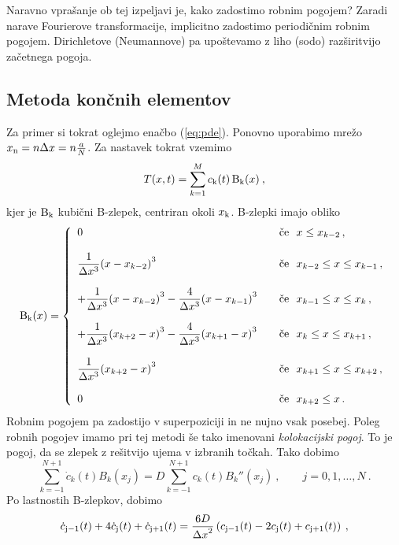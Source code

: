 \documentclass{porocilo}
\begin{document}
\newpage
Naravno vprašanje ob tej izpeljavi je, kako zadostimo robnim pogojem? Zaradi narave Fourierove transformacije, implicitno zadostimo periodičnim robnim pogojem. Dirichletove (Neumannove) pa upoštevamo z liho (sodo) razširitvijo začetnega pogoja.

\subsection{Metoda končnih elementov}
Za primer si tokrat oglejmo enačbo (\ref{eq:pde}). Ponovno uporabimo mrežo $x_{\rm n} = n \Delta x = n \tfrac{a}{N}$. Za nastavek tokrat vzemimo
\begin{equation*}
    T(x, t) = \sum_{k=1}^{M} c_{\rm k}(t) \, \mathrm{B}_{\rm k}(x) \>,
\end{equation*}
kjer je $\mathrm{B}_{\rm k}$ kubični B-zlepek, centriran okoli $x_{\rm k}$. B-zlepki imajo obliko
\begin{equation*}
    \mathrm{B}_{\rm k}(x) = \left\{
    \begin{array}{ll}
        0
         & \quad\text{če~~} x \le x_{k-2} \, , \cr
         & \cr
        \displaystyle\frac{1}{\Delta x^3} {(x - x_{k-2})}^3
         & \quad\text{če~~} x_{k-2} \le x \le x_{k-1} \, , \cr
         & \cr
        +\displaystyle\frac{1}{\Delta x^3} {(x - x_{k-2})}^3
        -\displaystyle\frac{4}{\Delta x^3} {(x - x_{k-1})}^3
         & \quad\text{če~~} x_{k-1} \le x \le x_{k} \, , \cr
         & \cr
        +\displaystyle\frac{1}{\Delta x^3} {(x_{k+2} - x)}^3
        -\displaystyle\frac{4}{\Delta x^3} {(x_{k+1} - x)}^3
         & \quad\text{če~~} x_{k} \le x \le x_{k+1} \, , \cr
         & \cr
        \displaystyle\frac{1}{\Delta x^3} {(x_{k+2} - x)}^3
         & \quad\text{če~~} x_{k+1} \le x \le x_{k+2} \, , \cr
         & \cr
        0
         & \quad\text{če~~} x_{k+2} \le x \, .
    \end{array}\right.
\end{equation*}
Robnim pogojem pa zadostijo v superpoziciji in ne nujno vsak posebej. Poleg robnih pogojev imamo pri tej metodi še tako imenovani \textit{kolokacijski pogoj}. To je pogoj, da se zlepek z rešitvijo ujema v izbranih točkah. Tako dobimo
\begin{equation*}
    \sum_{k=-1}^{N+1} \dot{c}_k(t) B_k(x_j) =
    D \sum_{k=-1}^{N+1} c_k(t) B_k''(x_j) \>, \qquad j = 0,1,\ldots,N \>.
\end{equation*}
Po lastnostih B-zlepkov, dobimo
\begin{equation*}
    \dot{c}_{\rm j-1}(t) + 4\dot{c}_{\rm j}(t) + \dot{c}_{\rm j+1}(t)
    = {\frac{6D}{{\Delta x}^2}} \left(c_{\rm j-1}(t) - 2c_{\rm j}(t) + c_{\rm j+1}(t) \right) \>,
\end{equation*}
\end{document}
